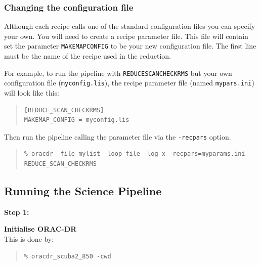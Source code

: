 \documentclass[twoside,11pt]{article}
\newcommand{\xlabel}[1]{}
\renewcommand{\_}{\texttt{\symbol{95}}}
\newenvironment{myquote}{
   \color{MidnightBlue}\begin{quote}\begin{small}}{
   \end{small}\end{quote}
}
\newcommand{\drrecipe}[1]{\texttt{#1}}
\newcommand{\param}[1]{\texttt{#1}}
\newcommand{\file}[1]{\texttt{#1}}
\renewenvironment{myquote}{
      \begin{quote}\begin{small}}{
      \end{small}\end{quote}
   }
\begin{document}
\subsubsection{Changing the configuration file}

Although each recipe calls one of the standard configuration files
you can specify your own. You will need to create a recipe parameter
file. This file will contain set the parameter \param{MAKEMAP\_CONFIG} to be
your new configuration file. The first line must be the name of the
recipe used in the reduction.

For example, to run the pipeline with \drrecipe{REDUCE\_SCAN\_CHECKRMS} but your
own configuration file (\file{myconfig.lis}), the recipe parameter file
(named \file{mypars.ini}) will look like this:
\vspace{0.2cm}
\begin{quote}
\begin{verbatim}
[REDUCE_SCAN_CHECKRMS]
MAKEMAP_CONFIG = myconfig.lis
\end{verbatim}
\end{quote}

Then run the pipeline calling the parameter file via the
\texttt{-recpars} option.
\begin{myquote}
\begin{verbatim}
% oracdr -file mylist -loop file -log x -recpars=myparams.ini REDUCE_SCAN_CHECKRMS
\end{verbatim}
\end{myquote}


\subsection{\xlabel{running_pl}Running the Science Pipeline}
\label{sec:plsteps}

\begin{minipage}[t]{0.15\linewidth}
\textbf{Step 1:}
\end{minipage}
\begin{minipage}[t]{0.85\linewidth}
\textbf{Initialise ORAC-DR} \\This is done by:
\begin{myquote}
\begin{verbatim}
% oracdr_scuba2_850 -cwd
\end{verbatim}
\end{myquote}
\end{minipage}
\end{document}
